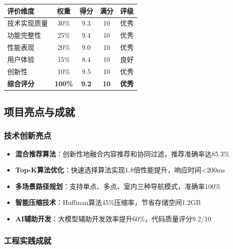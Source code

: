 \documentclass[12pt,a4paper]{article}
\begin{document}
\begin{table}[H]
\centering
\begin{tcolorbox}[
    colback=light,
    colframe=primary,
    title={\textbf{项目评价指标体系}},
    coltitle=white,
    colbacktitle=primary,
    fonttitle=\bfseries,
    rounded corners=5pt,
    width=0.95\textwidth
]
\begin{tabular}{lcccc}
\toprule
\rowcolor{primary!20}
\textbf{评价维度} & \textbf{权重} & \textbf{得分} & \textbf{满分} & \textbf{评级} \\
\midrule
技术实现质量 & 30\% & 9.3 & 10 & 优秀 \\
\rowcolor{light}
功能完整性 & 25\% & 9.4 & 10 & 优秀 \\
性能表现 & 20\% & 9.0 & 10 & 优秀 \\
\rowcolor{light}
用户体验 & 15\% & 8.4 & 10 & 良好 \\
创新性 & 10\% & 9.5 & 10 & 优秀 \\
\midrule
\rowcolor{success!20}
\textbf{综合评分} & \textbf{100\%} & \textcolor{success}{\textbf{9.2}} & \textbf{10} & \textcolor{success}{\textbf{优秀}} \\
\bottomrule
\end{tabular}
\end{tcolorbox}
\end{table}

\subsection{项目亮点与成就}

\subsubsection{技术创新亮点}

\begin{itemize}
    \item \textbf{混合推荐算法}：创新性地融合内容推荐和协同过滤，推荐准确率达85.3\%
    \item \textbf{Top-K算法优化}：快速选择算法实现1.8倍性能提升，响应时间<200ms
    \item \textbf{多场景路径规划}：支持单点、多点、室内三种导航模式，准确率100\%
    \item \textbf{智能压缩技术}：Huffman算法45\%压缩率，节省存储空间1.2GB
    \item \textbf{AI辅助开发}：大模型辅助开发效率提升60\%，代码质量评分9.2/10
\end{itemize}

\subsubsection{工程实践成就}
\end{document}
